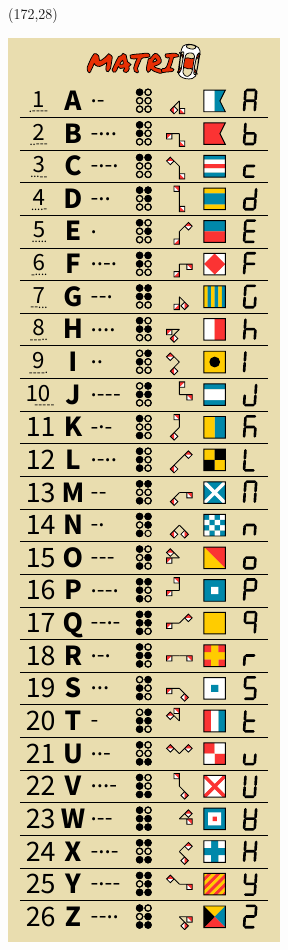 \documentclass{extarticle}
\begin{document}
\begin{textblock}{42}(172,28)
\vfill
{\centerline{\includegraphics[scale=1,]{front.pdf}}} 
\vfill
\end{textblock}
\end{document}
